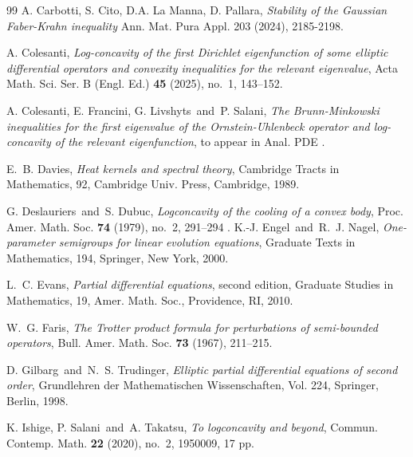 \documentclass[12pt]{amsart}
\newcommand{\1}{\mathbf 1}
\begin{document}
\begin{thebibliography}{99}
 A. Carbotti, S. Cito, D.A. La Manna, D. Pallara, \emph{Stability of the Gaussian Faber-Krahn inequality} Ann. Mat. Pura Appl. 203 (2024), 2185-2198.

A. Colesanti, {\it Log-concavity of the first Dirichlet eigenfunction of some elliptic differential operators and convexity inequalities for the relevant eigenvalue}, Acta Math. Sci. Ser. B (Engl. Ed.) {\bf 45} (2025), no.~1, 143--152.

A. Colesanti, E. Francini, G. Livshyts\ and\ P. Salani, {\em The Brunn-Minkowski inequalities for the first eigenvalue of the Ornstein-Uhlenbeck operator and log-concavity of the relevant eigenfunction}, to appear in Anal. PDE .


E.~B. Davies, {\em Heat kernels and spectral theory}, Cambridge Tracts in Mathematics, 92, Cambridge Univ. Press, Cambridge, 1989.

G. Deslauriers\ and\ S. Dubuc, {\em Logconcavity of the cooling of a convex body}, Proc. Amer. Math. Soc. {\bf 74} (1979), no.~2, 291--294
.
K.-J. Engel\ and\ R.~J. Nagel, {\it One-parameter semigroups for linear evolution equations}, Graduate Texts in Mathematics, 194, Springer, New York, 2000.

L.~C. Evans, {\em Partial differential equations}, second edition, Graduate Studies in Mathematics, 19, Amer. Math. Soc., Providence, RI, 2010.

W.~G. Faris, {\em The Trotter product formula for perturbations of semi-bounded operators}, Bull. Amer. Math. Soc. {\bf 73} (1967), 211--215.

D. Gilbarg\ and\ N.~S. Trudinger, {\it Elliptic partial differential equations of second order}, Grundlehren der Mathematischen Wissenschaften, Vol. 224, Springer, Berlin, 1998.


K. Ishige, P. Salani\ and\ A. Takatsu, {\em To logconcavity and beyond}, Commun. Contemp. Math. {\bf 22} (2020), no.~2, 1950009, 17 pp.


\end{thebibliography}
\end{document}
